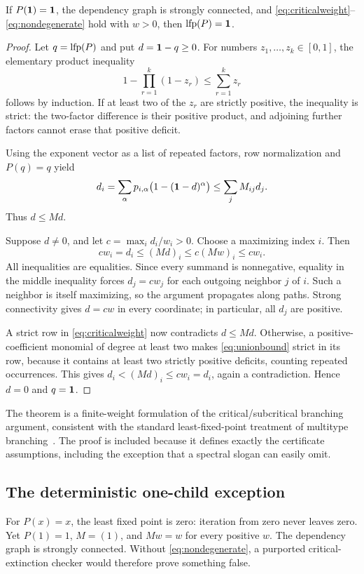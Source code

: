 \begin{theorem}
\label{thm:critical}
If $P(\mathbf 1)=\mathbf 1$, the dependency graph is strongly connected, and \eqref{eq:criticalweight}--\eqref{eq:nondegenerate} hold with $w>0$, then $\operatorname{lfp}(P)=\mathbf 1$.
\end{theorem}
\begin{proof}
Let $q=\operatorname{lfp}(P)$ and put $d=\mathbf 1-q\ge0$. For numbers $z_1,\ldots,z_k\in[0,1]$, the elementary product inequality
\begin{equation}
 \label{eq:unionbound}
 1-\prod_{r=1}^k(1-z_r)\le\sum_{r=1}^kz_r
\end{equation}
follows by induction. If at least two of the $z_r$ are strictly positive, the inequality is strict: the two-factor difference is their positive product, and adjoining further factors cannot erase that positive deficit.

Using the exponent vector as a list of repeated factors, row normalization and $P(q)=q$ yield
\[
 d_i=\sum_\alpha p_{i,\alpha}\bigl(1-(\mathbf 1-d)^\alpha\bigr)
 \le\sum_jM_{ij}d_j.
\]
Thus $d\le Md$.

Suppose $d\ne0$, and let $c=\max_i d_i/w_i>0$. Choose a maximizing index $i$. Then
\[
 cw_i=d_i\le(Md)_i\le c(Mw)_i\le cw_i.
\]
All inequalities are equalities. Since every summand is nonnegative, equality in the middle inequality forces $d_j=cw_j$ for each outgoing neighbor $j$ of $i$. Such a neighbor is itself maximizing, so the argument propagates along paths. Strong connectivity gives $d=cw$ in every coordinate; in particular, all $d_j$ are positive.

A strict row in \eqref{eq:criticalweight} now contradicts $d\le Md$. Otherwise, a positive-coefficient monomial of degree at least two makes \eqref{eq:unionbound} strict in its row, because it contains at least two strictly positive deficits, counting repeated occurrences. This gives $d_i<(Md)_i\le cw_i=d_i$, again a contradiction. Hence $d=0$ and $q=\mathbf 1$.
\end{proof}

The theorem is a finite-weight formulation of the critical/subcritical branching argument, consistent with the standard least-fixed-point treatment of multitype branching~\cite{etessami-stewart-yannakakis}. The proof is included because it defines exactly the certificate assumptions, including the exception that a spectral slogan can easily omit.

\subsection{The deterministic one-child exception}
For $P(x)=x$, the least fixed point is zero: iteration from zero never leaves zero. Yet $P(1)=1$, $M=(1)$, and $Mw=w$ for every positive $w$. The dependency graph is strongly connected. Without \eqref{eq:nondegenerate}, a purported critical-extinction checker would therefore prove something false.

